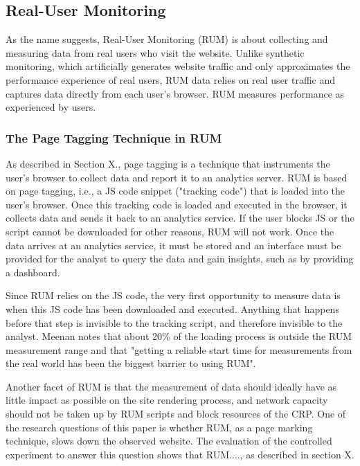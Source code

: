 \subsection{Real-User Monitoring} %
\label{subsection:RUM}

As the name suggests, Real-User Monitoring (RUM) is about collecting and measuring data from real users who visit the website.
Unlike synthetic monitoring, which artificially generates website traffic and only approximates the performance experience of real users, RUM data relies on real user traffic and captures data directly from each user's browser. 
RUM measures performance as experienced by users. %


\subsubsection{The Page Tagging Technique in RUM} %


As described in Section X., page tagging is a technique that instruments the user's browser to collect data and report it to an analytics server.
RUM is based on page tagging, i.e., a JS code snippet ("tracking code") that is loaded into the user's browser.
Once this tracking code is loaded and executed in the browser, it collects data and sends it back to an analytics service.
If the user blocks JS or the script cannot be downloaded for other reasons, RUM will not work.
Once the data arrives at an analytics service, it must be stored and an interface must be provided for the analyst to query the data and gain insights, such as by providing a dashboard.

Since RUM relies on the JS code, the very first opportunity to measure data is when this JS code has been downloaded and executed.
Anything that happens before that step is invisible to the tracking script, and therefore invisible to the analyst.
Meenan notes that about 20\% of the loading process is outside the RUM measurement range and that "getting a reliable start time for measurements from the real world has been the biggest barrier to using RUM". %

Another facet of RUM is that the measurement of data should ideally have as little impact as possible on the site rendering process, and network capacity should not be taken up by RUM scripts and block resources of the CRP. %
One of the research questions of this paper is whether RUM, as a page marking technique, slows down the observed website.
The evaluation of the controlled experiment to answer this question shows that RUM...., as described in section X. %


